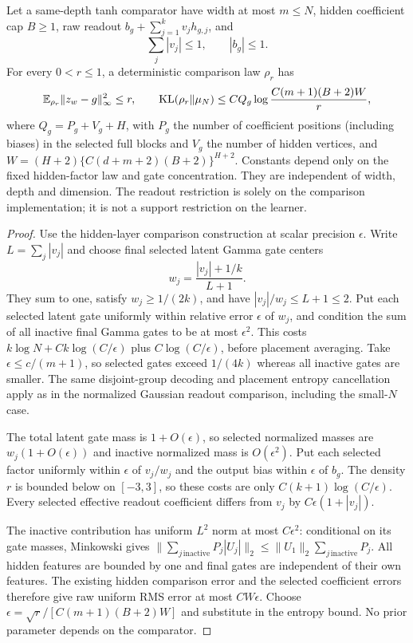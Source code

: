\begin{lemma}
\label{lem:asinh-comparison}
Let a same-depth tanh comparator have width at most $m\le N$, hidden
coefficient cap $B\ge1$, raw readout $b_g+\sum_{j=1}^kv_jh_{g,j}$,
and
\[
 \sum_j|v_j|\le1,\qquad |b_g|\le1.
\]
For every $0<r\le1$, a deterministic comparison law $\rho_r$ has
\[
 \mathbb E_{\rho_r}\|z_w-g\|_\infty^2\le r,\qquad
 \operatorname{KL}(\rho_r\|\mu_N)
 \le C Q_g\log\frac{C(m+1)(B+2)W}{r},
\]
where $Q_g=P_g+V_g+H$, with $P_g$ the number of coefficient positions
(including biases) in the selected full blocks and $V_g$ the number
of hidden vertices, and
$W=(H+2)\{C(d+m+2)(B+2)\}^{H+2}$.
Constants depend only on the fixed hidden-factor law and gate
concentration. They are independent of width, depth and dimension.
The readout restriction is solely on the comparison implementation;
it is not a support restriction on the learner.
\end{lemma}
\begin{proof}
Use the hidden-layer comparison construction at scalar precision
$\epsilon$. Write $L=\sum_j|v_j|$ and choose final selected latent
Gamma gate centers
\[
 w_j=\frac{|v_j|+1/k}{L+1}.
\]
They sum to one, satisfy $w_j\ge1/(2k)$, and have
$|v_j|/w_j\le L+1\le2$. Put each selected latent gate uniformly
within relative error $\epsilon$ of $w_j$, and condition the sum of
all inactive final Gamma gates to be at most $\epsilon^2$.
This costs $k\log N+Ck\log(C/\epsilon)$ plus
$C\log(C/\epsilon)$, before placement averaging. Take
$\epsilon\le c/(m+1)$, so selected gates exceed $1/(4k)$ whereas
all inactive gates are smaller. The same disjoint-group decoding and
placement entropy cancellation apply as in the normalized Gaussian
readout comparison, including the small-$N$ case.

The total latent gate mass is $1+O(\epsilon)$, so selected normalized
masses are $w_j(1+O(\epsilon))$ and inactive normalized mass is
$O(\epsilon^2)$. Put each selected factor uniformly within
$\epsilon$ of $v_j/w_j$ and the output bias within $\epsilon$ of
$b_g$. The density $r$ is bounded below on $[-3,3]$, so these costs
are only $C(k+1)\log(C/\epsilon)$.
Every selected effective readout coefficient differs from $v_j$ by
$C\epsilon(1+|v_j|)$.

The inactive contribution has uniform $L^2$ norm at most
$C\epsilon^2$: conditional on its gate masses, Minkowski gives
$\|\sum_{j\,\mathrm{inactive}}P_j|U_j|\|_2
\le\|U_1\|_2\sum_{j\,\mathrm{inactive}}P_j$.
All hidden features are bounded by one and final gates are independent
of their own features. The existing hidden comparison error and the
selected coefficient errors therefore give raw uniform RMS error
at most $CW\epsilon$. Choose
$\epsilon=\sqrt r/[C(m+1)(B+2)W]$ and substitute in the entropy
bound. No prior parameter depends on the comparator.
\end{proof}

